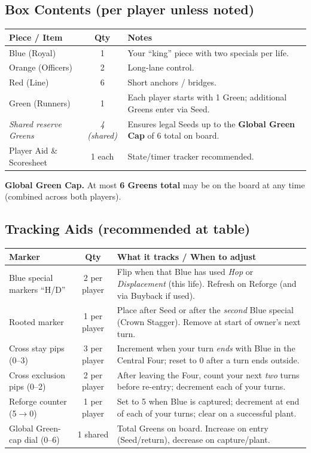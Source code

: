 \documentclass[11pt]{article}
\begin{document}
\subsection*{Box Contents (per player unless noted)}
\begin{tabularx}{\linewidth}{@{}l c X@{}}
\toprule
\textbf{Piece / Item} & \textbf{Qty} & \textbf{Notes} \\
\midrule
Blue (Royal) & 1 & Your ``king'' piece with two specials per life. \\
Orange (Officers) & 2 & Long-lane control. \\
Red (Line) & 6 & Short anchors / bridges. \\
Green (Runners) & 1 & Each player starts with 1 Green; additional Greens enter via Seed. \\
\textit{Shared reserve Greens} & \textit{4 (shared)} & Ensures legal Seeds up to the \textbf{Global Green Cap} of 6 total on board. \\
\midrule
Player Aid \& Scoresheet & 1 each & State/timer tracker recommended. \\
\bottomrule
\end{tabularx}

\smallskip
\noindent\textbf{Global Green Cap.} At most \textbf{6 Greens total} may be on the board at any time (combined across both players).

\subsection*{Tracking Aids (recommended at table)}
\begin{tabularx}{\linewidth}{@{}l c X@{}}
\toprule
\textbf{Marker} & \textbf{Qty} & \textbf{What it tracks / When to adjust} \\
\midrule
Blue special markers ``H/D'' & 2 per player & Flip when that Blue has used \emph{Hop} or \emph{Displacement} (this life). Refresh on Reforge (and via Buyback if used). \\
Rooted marker & 1 per player & Place after Seed or after the \emph{second} Blue special (Crown Stagger). Remove at start of owner's next turn. \\
Cross stay pips (0--3) & 3 per player & Increment when your turn \emph{ends} with Blue in the Central Four; reset to 0 after a turn ends outside. \\
Cross exclusion pips (0--2) & 2 per player & After leaving the Four, count your next \emph{two} turns before re-entry; decrement each of your turns. \\
Reforge counter (5$\rightarrow$0) & 1 per player & Set to 5 when Blue is captured; decrement at end of each of your turns; clear on a successful plant. \\
Global Green-cap dial (0--6) & 1 shared & Total Greens on board. Increase on entry (Seed/return), decrease on capture/plant. \\
\bottomrule
\end{tabularx}
\end{document}
